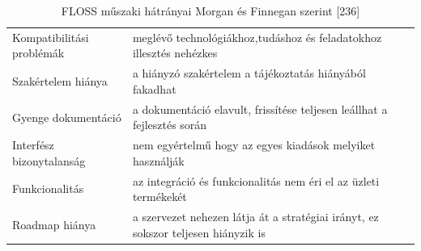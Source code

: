 \documentclass[12pt,magyar,a4paper,oneside]{scrreprt}
\begin{document}
\begin{longtable}[]{@{}ll@{}}
\caption{FLOSS műszaki hátrányai Morgan és Finnegan szerint
{[}236{]}}\tabularnewline
\toprule
\endhead
\begin{minipage}[t]{0.26\columnwidth}\raggedright
Kompatibilitási problémák\strut
\end{minipage} & \begin{minipage}[t]{0.68\columnwidth}\raggedright
meglévő technológiákhoz,tudáshoz és feladatokhoz illesztés
nehézkes\strut
\end{minipage}\tabularnewline
\begin{minipage}[t]{0.26\columnwidth}\raggedright
Szakértelem hiánya\strut
\end{minipage} & \begin{minipage}[t]{0.68\columnwidth}\raggedright
a hiányzó szakértelem a tájékoztatás hiányából fakadhat\strut
\end{minipage}\tabularnewline
\begin{minipage}[t]{0.26\columnwidth}\raggedright
Gyenge dokumentáció\strut
\end{minipage} & \begin{minipage}[t]{0.68\columnwidth}\raggedright
a dokumentáció elavult, frissítése teljesen leállhat a fejlesztés
során\strut
\end{minipage}\tabularnewline
\begin{minipage}[t]{0.26\columnwidth}\raggedright
Interfész bizonytalanság\strut
\end{minipage} & \begin{minipage}[t]{0.68\columnwidth}\raggedright
nem egyértelmű hogy az egyes kiadások melyiket használják\strut
\end{minipage}\tabularnewline
\begin{minipage}[t]{0.26\columnwidth}\raggedright
Funkcionalitás\strut
\end{minipage} & \begin{minipage}[t]{0.68\columnwidth}\raggedright
az integráció és funkcionalitás nem éri el az üzleti termékekét\strut
\end{minipage}\tabularnewline
\begin{minipage}[t]{0.26\columnwidth}\raggedright
Roadmap hiánya\strut
\end{minipage} & \begin{minipage}[t]{0.68\columnwidth}\raggedright
a szervezet nehezen látja át a stratégiai irányt, ez sokszor teljesen
hiányzik is\strut
\end{minipage}\tabularnewline
\bottomrule
\end{longtable}
\end{document}
